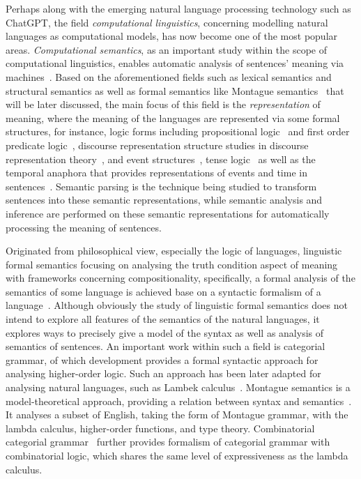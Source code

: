 Perhaps along with the emerging natural language processing technology such as ChatGPT, the field \emph{computational linguistics}, concerning modelling natural languages as computational models, has now become one of the most popular areas. \emph{Computational semantics}, as an important study within the scope of computational linguistics, enables automatic analysis of sentences' meaning via machines~\citep{mitkov2022}. Based on the aforementioned fields such as lexical semantics and structural semantics as well as formal semantics like Montague semantics~\citep{Montague1970-MONEAA-2} that will be later discussed, the main focus of this field is the \emph{representation} of meaning, where the meaning of the languages are represented via some formal structures, for instance, logic forms including propositional logic~\citep{boole1854investigation} and first order predicate logic~\citep{Frege1879-FREBAF-2}, discourse representation structure studies in discourse representation theory~\citep{Kamp1993-KAMFDT}, and event structures~\citep{PUSTEJOVSKY199147}, tense logic~\citep{Prior1955-PRITAM, Kamp1968-KAMTLA} as well as the temporal anaphora that provides representations of events and time in sentences~\citep{partee1884, hinrichs1986}. Semantic parsing is the technique being studied to transform sentences into these semantic representations, while semantic analysis and inference are performed on these semantic representations for automatically processing the meaning of sentences.

Originated from philosophical view, especially the logic of languages, linguistic formal semantics focusing on analysing the truth condition aspect of meaning with frameworks concerning compositionality, specifically, a formal analysis of the semantics of some language is achieved base on a syntactic formalism of a language~\citep{alma999704883502466}. Although obviously the study of linguistic formal semantics does not intend to explore all features of the semantics of the natural languages, it explores ways to precisely give a model of the syntax as well as analysis of semantics of sentences. An important work within such a field is categorial grammar, of which  development provides a formal syntactic approach for analysing higher-order logic. Such an approach has been later adapted for analysing natural languages, such as Lambek calculus~\citep{Lambek1958-LAMTMO-5}. Montague semantics is a model-theoretical approach, providing a relation between syntax and semantics~\citep{Montague1970-MONEAA-2}. It analyses a subset of English, taking the form of Montague grammar, with the lambda calculus, higher-order functions, and type theory. Combinatorial categorial grammar~\citep{steedman2001, steedman2011combinatory} further provides formalism of categorial grammar with combinatorial logic, which shares the same level of expressiveness as the lambda calculus.
\begin{center}
\vspace{-0.7em}
\vspace{-0.3em}
\end{center}

